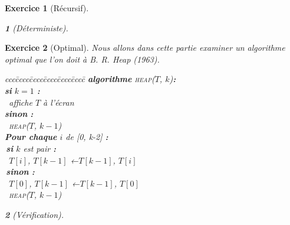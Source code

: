 \documentclass{article}
\theoremstyle{exostyle}
\newtheorem{exo}{Exercice}
\theoremstyle{partiestyle}
\newtheorem{partie}{}[exo]
\theoremstyle{questionstyle}
\begin{document}
\begin{exo}[Récursif]
\begin{partie}[Déterministe]
    \end{partie}
\end{exo}

\begin{exo}[Optimal]
    Nous allons dans cette partie examiner un algorithme optimal que l'on doit à B. R. Heap (1963).
        \begin{tabbing}
            ccc\=cccc\=cccc\=cccc\=cccc\=cccc\=\kill
            \textbf{algorithme} \textsc{heap}($T$, $k$){\bf :}\\
            \>\textbf{si} $k = 1$ {\bf :}\\
            \> \>\vline $\,$ affiche $T$ à l'écran  \\
            \>\textbf{sinon} {\bf :}\\
            \> \>\vline $\,$ \textsc{heap}($T$, $k-1$)\\
            \> \textbf{Pour chaque} $i$ de [0, k-2] {\bf :}\\
            \> \>\vline $\,$\textbf{si} $k$ est pair {\bf :}\\
            \> \>\vline \>\vline $\,$ $T[i]$, $T[k-1]$ ←$T[k-1]$, $T[i]$\\
            \> \>\vline $\,$\textbf{sinon} {\bf :}\\
            \> \>\vline \>\vline $\,$ $T[0]$, $T[k-1]$ ←$T[k-1]$, $T[0]$\\
            \> \>\vline $\,$ \textsc{heap}($T$, $k-1$)\\
        \end{tabbing}

    \begin{partie}[Vérification]
        

\end{partie}
\end{exo}
\end{document}
